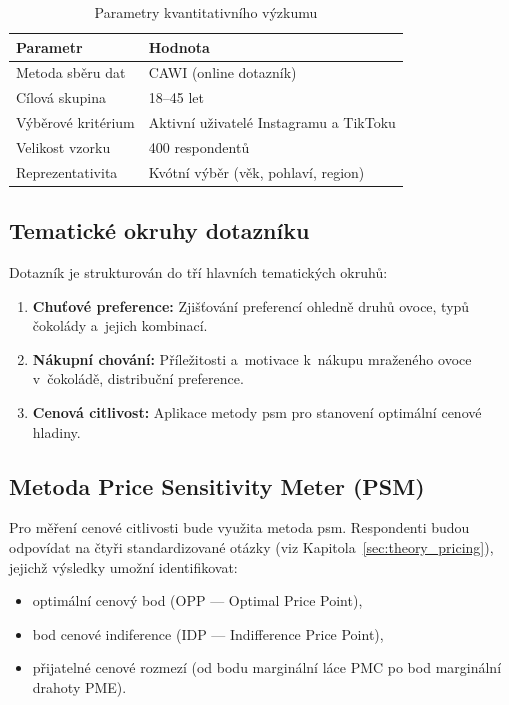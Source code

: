 \begin{table}[H]
\centering
\caption{Parametry kvantitativního výzkumu}
\label{tab:cawi_params}
\begin{tabular}{ll}
\toprule
\textbf{Parametr} & \textbf{Hodnota} \\
\midrule
Metoda sběru dat & CAWI (online dotazník) \\
Cílová skupina & 18--45 let \\
Výběrové kritérium & Aktivní uživatelé Instagramu a TikToku \\
Velikost vzorku & 400 respondentů \\
Reprezentativita & Kvótní výběr (věk, pohlaví, region) \\
\bottomrule
\end{tabular}
\end{table}

\subsection{Tematické okruhy dotazníku}

Dotazník je strukturován do tří hlavních tematických okruhů:

\begin{enumerate}
  \item \textbf{Chuťové preference:} Zjišťování preferencí ohledně druhů ovoce, typů čokolády a~jejich kombinací.
  \item \textbf{Nákupní chování:} Příležitosti a~motivace k~nákupu mraženého ovoce v~čokoládě, distribuční preference.
  \item \textbf{Cenová citlivost:} Aplikace metody \gls{psm} \parencite{vanwestendorp_1976} pro stanovení optimální cenové hladiny.
\end{enumerate}

\subsection{Metoda Price Sensitivity Meter (PSM)}

Pro měření cenové citlivosti bude využita metoda \gls{psm}. Respondenti budou odpovídat na čtyři standardizované otázky (viz Kapitola~\ref{sec:theory_pricing}), jejichž výsledky umožní identifikovat:
\begin{itemize}
  \item optimální cenový bod (OPP — Optimal Price Point),
  \item bod cenové indiference (IDP — Indifference Price Point),
  \item přijatelné cenové rozmezí (od bodu marginální láce PMC po bod marginální drahoty PME).
\end{itemize}

